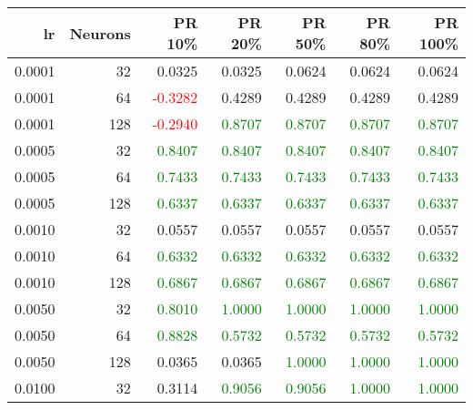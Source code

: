 \begin{tabular}{rrrrrrr}
\toprule
lr & Neurons & PR 10\% & PR 20\% & PR 50\% & PR 80\% & PR 100\% \\
\midrule
0.0001 & 32 & \textcolor{blu} {0.0325} & \textcolor{blu} {0.0325} & \textcolor{blu} {0.0624} & \textcolor{blu} {0.0624} & \textcolor{blu} {0.0624} \\
0.0001 & 64 & \textcolor{red} {-0.3282} & \textcolor{blu} {0.4289} & \textcolor{blu} {0.4289} & \textcolor{blu} {0.4289} & \textcolor{blu} {0.4289} \\
0.0001 & 128 & \textcolor{red} {-0.2940} & \textcolor{green} {0.8707} & \textcolor{green} {0.8707} & \textcolor{green} {0.8707} & \textcolor{green} {0.8707} \\
0.0005 & 32 & \textcolor{green} {0.8407} & \textcolor{green} {0.8407} & \textcolor{green} {0.8407} & \textcolor{green} {0.8407} & \textcolor{green} {0.8407} \\
0.0005 & 64 & \textcolor{green} {0.7433} & \textcolor{green} {0.7433} & \textcolor{green} {0.7433} & \textcolor{green} {0.7433} & \textcolor{green} {0.7433} \\
0.0005 & 128 & \textcolor{green} {0.6337} & \textcolor{green} {0.6337} & \textcolor{green} {0.6337} & \textcolor{green} {0.6337} & \textcolor{green} {0.6337} \\
0.0010 & 32 & \textcolor{blu} {0.0557} & \textcolor{blu} {0.0557} & \textcolor{blu} {0.0557} & \textcolor{blu} {0.0557} & \textcolor{blu} {0.0557} \\
0.0010 & 64 & \textcolor{green} {0.6332} & \textcolor{green} {0.6332} & \textcolor{green} {0.6332} & \textcolor{green} {0.6332} & \textcolor{green} {0.6332} \\
0.0010 & 128 & \textcolor{green} {0.6867} & \textcolor{green} {0.6867} & \textcolor{green} {0.6867} & \textcolor{green} {0.6867} & \textcolor{green} {0.6867} \\
0.0050 & 32 & \textcolor{green} {0.8010} & \textcolor{green} {1.0000} & \textcolor{green} {1.0000} & \textcolor{green} {1.0000} & \textcolor{green} {1.0000} \\
0.0050 & 64 & \textcolor{green} {0.8828} & \textcolor{green} {0.5732} & \textcolor{green} {0.5732} & \textcolor{green} {0.5732} & \textcolor{green} {0.5732} \\
0.0050 & 128 & \textcolor{blu} {0.0365} & \textcolor{blu} {0.0365} & \textcolor{green} {1.0000} & \textcolor{green} {1.0000} & \textcolor{green} {1.0000} \\
0.0100 & 32 & \textcolor{blu} {0.3114} & \textcolor{green} {0.9056} & \textcolor{green} {0.9056} & \textcolor{green} {1.0000} & \textcolor{green} {1.0000} \\

\end{tabular}
